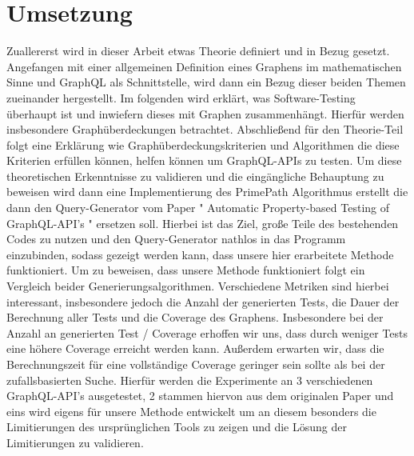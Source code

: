\section{Umsetzung}

Zuallererst wird in dieser Arbeit etwas Theorie definiert und in Bezug gesetzt. Angefangen mit einer allgemeinen Definition
eines Graphens im mathematischen Sinne und GraphQL als Schnittstelle, wird dann ein Bezug dieser beiden Themen
zueinander hergestellt.
Im folgenden wird erklärt, was Software-Testing überhaupt ist und inwiefern dieses mit Graphen zusammenhängt.
Hierfür werden insbesondere Graphüberdeckungen betrachtet.
Abschließend für den Theorie-Teil folgt eine Erklärung wie Graphüberdeckungskriterien und Algorithmen die diese Kriterien
erfüllen können, helfen können um GraphQL-APIs zu testen.
Um diese theoretischen Erkenntnisse zu validieren und die eingängliche Behauptung zu beweisen wird dann eine Implementierung
des PrimePath Algorithmus erstellt die dann den Query-Generator vom Paper " Automatic Property-based Testing of GraphQL-API's " ersetzen soll.
Hierbei ist das Ziel, große Teile des bestehenden Codes zu nutzen und den Query-Generator nathlos in das Programm einzubinden, sodass
gezeigt werden kann, dass unsere hier erarbeitete Methode funktioniert.
Um zu beweisen, dass unsere Methode funktioniert folgt ein Vergleich beider Generierungsalgorithmen.
Verschiedene Metriken sind hierbei interessant, insbesondere jedoch die Anzahl der generierten Tests, die Dauer
der Berechnung aller Tests und die Coverage des Graphens.
Insbesondere bei der Anzahl an generierten Test / Coverage erhoffen wir uns, dass durch weniger Tests eine höhere Coverage erreicht werden
kann. Außerdem erwarten wir, dass die Berechnungszeit für eine vollständige Coverage geringer sein sollte als bei der zufallsbasierten Suche.
Hierfür werden die Experimente an 3 verschiedenen GraphQL-API's ausgetestet, 2 stammen hiervon aus dem originalen Paper und eins wird
eigens für unsere Methode entwickelt um an diesem besonders die Limitierungen des ursprünglichen Tools zu zeigen und die Lösung der Limitierungen zu validieren.




